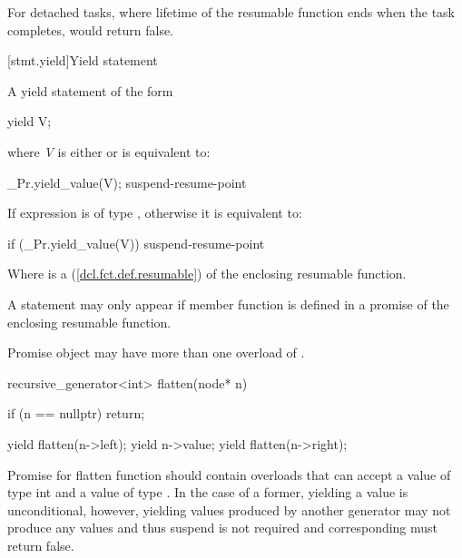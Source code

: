 For detached tasks, where lifetime of the resumable function ends
when the task completes,  would return false.
\exitnote

[stmt.yield]{Yield statement}%

\pnum
A yield statement of the form

\begin{codeblock}
  yield V;
\end{codeblock}

where \textit{V} is either  or  is equivalent to:

\begin{codeblock}
  _Pr.yield_value(V);
  suspend-resume-point
\end{codeblock}

If  expression is of type , otherwise it is equivalent to:

\begin{codeblock}
  if (_Pr.yield_value(V)) {
    suspend-resume-point
  }
\end{codeblock}

Where  is a  (\ref{dcl.fct.def.resumable}) of the enclosing resumable function.

\pnum
A  statement may only appear if  member
function is defined in a promise of the enclosing resumable function.

\pnum
Promise object may have more than one overload of .

\enterexample
\begin{codeblock}
  recursive_generator<int> flatten(node* n)
  {
    if (n == nullptr)
    return;
    
    yield flatten(n->left);
    yield n->value;
    yield flatten(n->right);
  }
\end{codeblock}

Promise for flatten function should contain overloads that can accept a value of type int and a value of type .
In the case of a former, yielding a value is unconditional, however, yielding values produced by another generator may not produce
any values and thus suspend is not required and corresponding  must return false. 
\exitexample